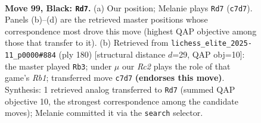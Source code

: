 \documentclass[11pt]{article}
\begin{document}
\begin{figure}[p]\centering
\begin{subfigure}{0.46\textwidth}\centering
\resizebox{\linewidth}{!}{%
\newchessgame
\chessboard[
  setfen={8/2r5/p2k4/P1p2p1p/1pR2P1P/4P1P1/1P4K1/8 b - - 10 99},
  showmover=false,
  pgfstyle=straightmove, color=movearrow, markmove={c7-d7}
]}
\caption{}
\end{subfigure}\hfill
\begin{subfigure}{0.46\textwidth}\centering
\resizebox{\linewidth}{!}{%
\newchessgame
\chessboard[
  setfen={8/1p6/p1p1rkp1/P6p/1PK2P1P/4P3/8/1R6 w - - 17 91},
  showmover=false,
  pgfstyle=straightmove, color=movearrow, markmove={b1-b3}
]}
\caption{}
\end{subfigure}
\\[4pt]

\caption{\textbf{Move 99, Black: \texttt{Rd7}.} (a) Our position; Melanie plays \texttt{Rd7} (\texttt{c7d7}). Panels (b)--(d) are the retrieved master positions whose correspondence most drove this move (highest QAP objective among those that transfer to it). (b) Retrieved from \texttt{lichess\_elite\_2025-11\_p0000\#884} (ply 180) [structural distance $d$=29, QAP obj=10]: the master played \texttt{Rb3}; under $\mu$ our \emph{Rc2} plays the role of that game's \emph{Rb1}; transferred move \texttt{c7d7} \textbf{(endorses this move)}. Synthesis: 1 retrieved analog transferred to \texttt{Rd7} (summed QAP objective 10, the strongest correspondence among the candidate moves); Melanie committed it via the \texttt{search} selector.}
\label{fig:thought-m197}
\end{figure}

\clearpage
\end{document}
